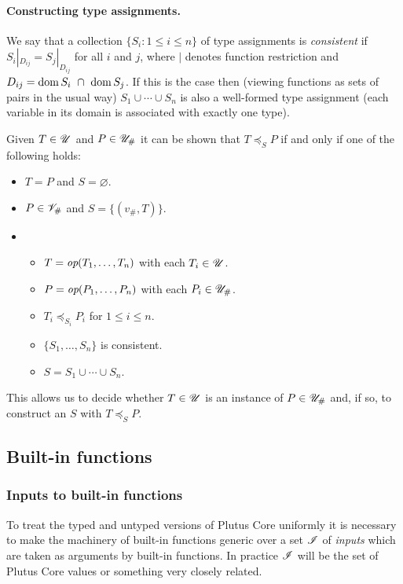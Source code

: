 \paragraph{Constructing type assignments.}
We say that a collection $\{S_i: 1 \leq i \leq n\}$ of type assignments is
\textit{consistent} if $S_i|_{D_{ij}} = S_j|_{D_{ij}}$ for all $i$ and $j$,
where $|$ denotes function restriction and $D_{ij} = \operatorname{dom} S_i \ \cap \ \operatorname{dom}
S_j$.  If this is the case then (viewing functions as sets of pairs in the usual
way) $S_1 \cup \cdots \cup S_n$ is also a well-formed type assignment (each
variable in its domain is associated with exactly one type).

\medskip
\noindent Given $T \in \mathscr{U}$ and $P \in {\mathscr{U}_{\#}}$ it can be shown that $T \preceq_S P$ if
and only if one of the following holds:
\begin{itemize}
  \item $T = P$ and $S =\varnothing$.
  \item $P \in \mathscr{V}_\#$ and $S = \{(v_\#, T)\}$.
  \item
    \begin{itemize}
    \item $T = \textit{op}(T_1, \ldots, T_n)$ with each $T_i \in \mathscr{U}$.
    \item $P = \textit{op}(P_1, \ldots, P_n)$ with each $P_i \in {\mathscr{U}_{\#}}$.
    \item $T_i \preceq_{S_i} P_i$ for $1 \leq i \leq n$.
    \item $\{S_1, \ldots, S_n\}$ is consistent.
    \item $S = S_1 \cup \cdots \cup S_n$.
    \end{itemize}
\end{itemize}

\noindent This allows us to decide whether $T \in \mathscr{U}$ is an instance of $P \in
{\mathscr{U}_{\#}}$ and, if so, to construct an $S$ with $T \preceq_S P$.


\subsection{Built-in functions}
\label{sec:builtin-functions}

\subsubsection{Inputs to built-in functions}
\label{sec:builtin-inputs}
To treat the typed and untyped versions of Plutus Core uniformly it is necessary
to make the machinery of built-in functions generic over a set $\mathscr{I}$ of
\textit{inputs} which are taken as arguments by built-in functions.  In practice
$\mathscr{I}$ will be the set of Plutus Core values or something very closely
related.%

